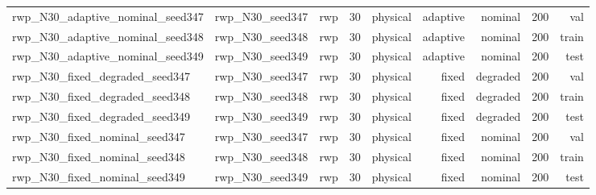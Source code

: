\begin{tabular}{lrrrrrrrr}
rwp\_N30\_adaptive\_nominal\_seed347 & rwp\_N30\_seed347 & rwp & 30 & physical & adaptive & nominal & 200 & val \\
rwp\_N30\_adaptive\_nominal\_seed348 & rwp\_N30\_seed348 & rwp & 30 & physical & adaptive & nominal & 200 & train \\
rwp\_N30\_adaptive\_nominal\_seed349 & rwp\_N30\_seed349 & rwp & 30 & physical & adaptive & nominal & 200 & test \\
rwp\_N30\_fixed\_degraded\_seed347 & rwp\_N30\_seed347 & rwp & 30 & physical & fixed & degraded & 200 & val \\
rwp\_N30\_fixed\_degraded\_seed348 & rwp\_N30\_seed348 & rwp & 30 & physical & fixed & degraded & 200 & train \\
rwp\_N30\_fixed\_degraded\_seed349 & rwp\_N30\_seed349 & rwp & 30 & physical & fixed & degraded & 200 & test \\
rwp\_N30\_fixed\_nominal\_seed347 & rwp\_N30\_seed347 & rwp & 30 & physical & fixed & nominal & 200 & val \\
rwp\_N30\_fixed\_nominal\_seed348 & rwp\_N30\_seed348 & rwp & 30 & physical & fixed & nominal & 200 & train \\
rwp\_N30\_fixed\_nominal\_seed349 & rwp\_N30\_seed349 & rwp & 30 & physical & fixed & nominal & 200 & test \\
\bottomrule
\end{tabular}